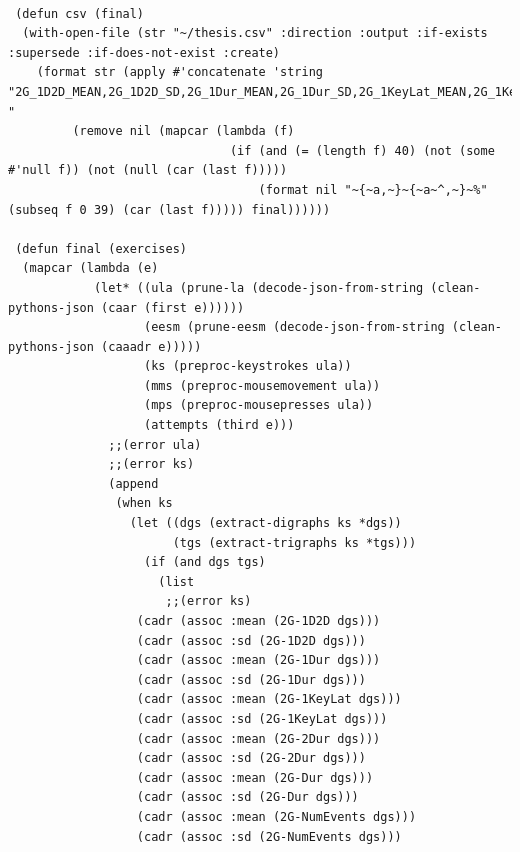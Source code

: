 \begin{lstlisting}[frame=single]

 (defun csv (final)
  (with-open-file (str "~/thesis.csv" :direction :output :if-exists :supersede :if-does-not-exist :create)
    (format str (apply #'concatenate 'string "2G_1D2D_MEAN,2G_1D2D_SD,2G_1Dur_MEAN,2G_1Dur_SD,2G_1KeyLat_MEAN,2G_1KeyLat_SD,2G_2Dur_MEAN,2G_2Dur_SD,2G_Dur_MEAN,2G_Dur_SD,2G_NumEvents_MEAN,2G_NumEvents_SD,3G_1D2D_MEAN,3G_1D2D_SD,3G_1Dur_MEAN,3G_1Dur_SD,3G_1KeyLat_MEAN,3G_1KeyLat_SD,3G_2D2D_MEAN,3G_2D2D_SD,3G_2Dur_MEAN,3G_2Dur_SD,3G_2KeyLat_MEAN,3G_2KeyLat_SD,3G_3Dur_MEAN,3G_3Dur_SD,3G_Dur_MEAN,3G_Dur_SD,3G_NumEvents_MEAN,3G_NumEvents_SD,Mouse_Presses_Dur_MEAN,Mouse_Presses_Dur_SD,Mouse_Movement_Dur_MEAN,Mouse_Movement_Dur_SD,Mouse_Movement_X_MEAN,Mouse_Movement_X_SD,Mouse_Movement_Y_MEAN,Mouse_Movement_Y_SD,Attempts,Frustration,Boredom,Distraction,Relaxation,Focus,Excitement
"
         (remove nil (mapcar (lambda (f)
                               (if (and (= (length f) 40) (not (some #'null f)) (not (null (car (last f)))))
                                   (format nil "~{~a,~}~{~a~^,~}~%" (subseq f 0 39) (car (last f))))) final))))))

 (defun final (exercises)
  (mapcar (lambda (e)
            (let* ((ula (prune-la (decode-json-from-string (clean-pythons-json (caar (first e))))))
                   (eesm (prune-eesm (decode-json-from-string (clean-pythons-json (caaadr e)))))
                   (ks (preproc-keystrokes ula))
                   (mms (preproc-mousemovement ula))
                   (mps (preproc-mousepresses ula))
                   (attempts (third e)))
              ;;(error ula)
              ;;(error ks)
              (append
               (when ks
                 (let ((dgs (extract-digraphs ks *dgs))
                       (tgs (extract-trigraphs ks *tgs)))
                   (if (and dgs tgs)
                     (list
                      ;;(error ks)
                  (cadr (assoc :mean (2G-1D2D dgs)))
                  (cadr (assoc :sd (2G-1D2D dgs)))
                  (cadr (assoc :mean (2G-1Dur dgs)))
                  (cadr (assoc :sd (2G-1Dur dgs)))
                  (cadr (assoc :mean (2G-1KeyLat dgs)))
                  (cadr (assoc :sd (2G-1KeyLat dgs)))
                  (cadr (assoc :mean (2G-2Dur dgs)))
                  (cadr (assoc :sd (2G-2Dur dgs)))
                  (cadr (assoc :mean (2G-Dur dgs)))
                  (cadr (assoc :sd (2G-Dur dgs)))
                  (cadr (assoc :mean (2G-NumEvents dgs)))
                  (cadr (assoc :sd (2G-NumEvents dgs)))


\end{lstlisting}
